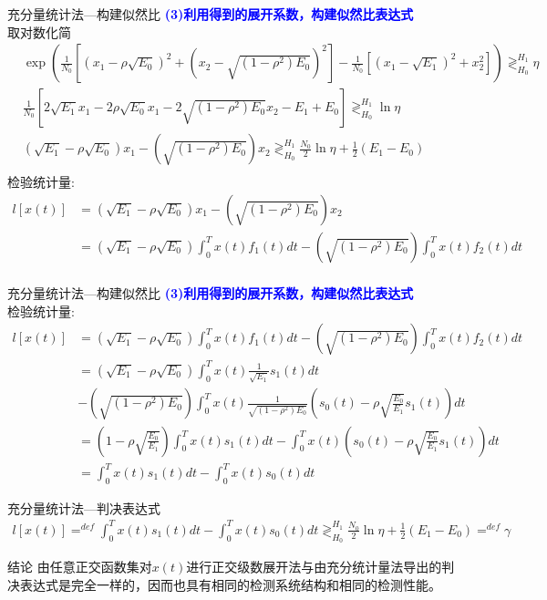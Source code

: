 \begin{frame}[shrink]{充分量统计法---构建似然比}
\textbf{\textcolor{blue}{(3)利用得到的展开系数，构建似然比表达式
}}\\
取对数化简
\begin{align*}
&\exp\left(
\frac{1}{N_0}\left[\left(x_1-\rho\sqrt{E_0}\right)^2+
\left(x_2-\sqrt{(1-\rho^2)E_0}\right)^2\right]-
\frac{1}{N_0}\left[\left(x_1-\sqrt{E_1}\right)^2+x_2^2\right]
\right)\mathop{\gtrless}_{H_0}^{H_1}\eta\\
&\frac{1}{N_0}\left[
2\sqrt{E_1}x_1-2\rho\sqrt{E_0}x_1-2\sqrt{(1-\rho^2)E_0}x_2-E_1+E_0
\right]\mathop{\gtrless}_{H_0}^{H_1}\ln\eta\\
&\left(\sqrt{E_1}-\rho\sqrt{E_0}\right)x_1-\left(\sqrt{(1-\rho^2)E_0}\right)x_2\mathop{\gtrless}_{H_0}^{H_1}\frac{N_0}{2}\ln\eta+\frac{1}{2}(E_1-E_0)\\
\end{align*}
检验统计量:
\begin{align*}
l[x(t)]&=\left(\sqrt{E_1}-\rho\sqrt{E_0}\right)x_1-\left(\sqrt{(1-\rho^2)E_0}\right)x_2\\
&=\left(\sqrt{E_1}-\rho\sqrt{E_0}\right)\int_{0}^{T}x(t)f_1(t)dt-\left(\sqrt{(1-\rho^2)E_0}\right)\int_{0}^{T}x(t)f_2(t)dt\\
\end{align*}
\end{frame}

\begin{frame}[shrink]{充分量统计法---构建似然比}
\textbf{\textcolor{blue}{(3)利用得到的展开系数，构建似然比表达式
}}\\
检验统计量:
\begin{align*}
l[x(t)]&=\left(\sqrt{E_1}-\rho\sqrt{E_0}\right)\int_{0}^{T}x(t)f_1(t)dt-\left(\sqrt{(1-\rho^2)E_0}\right)\int_{0}^{T}x(t)f_2(t)dt\\
&=\left(\sqrt{E_1}-\rho\sqrt{E_0}\right)\int_{0}^{T}x(t)\frac{1}{\sqrt{E_1}}s_1(t)dt\\
&- \left(\sqrt{(1-\rho^2)E_0}\right)\int_{0}^{T}x(t)\frac{1}{\sqrt{(1-\rho^2)E_0}}\left(s_0(t)-\rho\sqrt{\frac{E_0}{E_1}}s_1(t)\right)dt\\
&=\left(1-\rho\sqrt{\frac{E_0}{E_1}}\right)\int_{0}^{T}x(t)s_1(t)dt-\int_{0}^{T}x(t)\left(s_0(t)-\rho\sqrt{\frac{E_0}{E_1}}s_1(t)\right)dt\\
&=\int_{0}^{T}x(t)s_1(t)dt-\int_{0}^{T}x(t)s_0(t)dt
\end{align*}
\end{frame}

\begin{frame}[shrink]{充分量统计法---判决表达式}
\begin{align*}
l[x(t)]\mathop{=}^{def}\int_{0}^{T}x(t)s_1(t)dt-\int_{0}^{T}x(t)s_0(t)dt\mathop{\gtrless}_{H_0}^{H_1}\frac{N_0}{2}\ln\eta+\frac{1}{2}(E_1-E_0)\mathop{=}^{def}\gamma
\end{align*}
\begin{block}{结论}
	由任意正交函数集对$x(t)$进行正交级数展开法与由充分统计量法导出的判决表达式是完全一样的，因而也具有相同的检测系统结构和相同的检测性能。
\end{block}
\end{frame}

